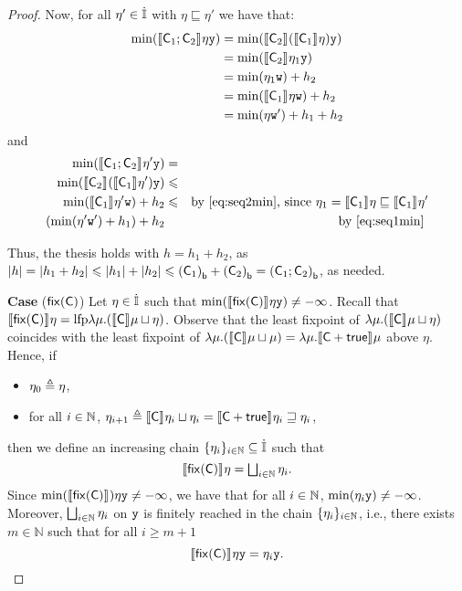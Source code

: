 \begin{proof}
  Now, for all \(\eta' \in \inte\) with \(\eta \sqsubseteq \eta'\) we have that:
  \begin{align*}
    \min(\semi{\com_1 \seq \com_2}\eta \var[y])
    &= \min(\semi{\com_2}(\semi{\com_1}\eta) \var[y])\\
    & = \min(\semi{\com_2}\eta_1 \var[y])\\
    & = \min(\eta_1 \var[w]) + h_2\\
    & = \min(\semi{\com_1}\eta \var[w]) + h_2\\
    & = \min(\eta \var[w]')+h_1 + h_2
  \end{align*}
  and
  \begin{align*}
    \min(\semi{\com_1 \seq \com_2}\eta' \var[y]) & = & \\ 
    \min(\semi{\com_2}(\semi{\com_1}\eta') \var[y]) & \leq & \\ 
    \min(\semi{\com_1}\eta' \var[w]) + h_2 & \leq & 
    \text{by~\eqref{eq:seq2min}, since } \eta_1 = \semi{\com_1}\eta \sqsubseteq \semi{\com_1}\eta' \\
    (\min(\eta' \var[w]') +h_1) + h_2 & & \text{by~\eqref{eq:seq1min}}\
  \end{align*}

  Thus, the thesis holds with \(h= h_1+h_2\), as
  \(|h| =|h_1 +h_2| \leq |h_1| + |h_2| \leq \lbound{\com_1} +
  \lbound{\com_2} = \lbound{\com_1 \seq \com_2}\), as needed.

  
  \medskip
  
  \noindent
  \textbf{Case} (\(\fix{\com}\)) 
  Let \(\eta \in \inte\) such that
  \(\min(\semi{\fix{\com}} \eta \var[y]) \neq - \infty\). Recall that
  \(\semi{\fix{\com}} \eta = \lfp{\lambda \mu. (\semi{\com} \mu
    \sqcup\eta)}\). Observe that the least fixpoint of
  \(\lambda \mu. (\semi{\com} \mu \sqcup\eta)\) coincides with the
  least fixpoint of
  \(\lambda \mu. (\semi{\com} \mu \sqcup \mu) = \lambda \mu. \semi{
    \com\ndet \tru} \mu\) above \(\eta\). Hence, if
  \begin{itemize}
  \item \(\eta_0 \veq \eta\),
  \item for all \(i\in \nat\),
    \(\eta_{i+1} \veq \semi{\com} \eta_i \sqcup \eta_i= \semi{\com \ndet
    \tru} \eta_i \sqsupseteq \eta_i\),
  \end{itemize}
  then we define an increasing chain \(\{\eta_i\}_{i\in \nat}\subseteq \inte\) such that
  \[ 
  \semi{\fix{\com}} \eta = \textstyle\bigsqcup_{i \in \nat} \eta_i.
  \]
  Since \(\min(\semi{\fix{\com}}) \eta \var[y] \neq -\infty\), we have
  that for all \(i\in \nat\), \(\min(\eta_i \var[y]) \neq
  -\infty\). Moreover, \(\textstyle\bigsqcup_{i \in \nat} \eta_i\) on
  \(\var[y]\) is finitely reached in the chain
  \(\{\eta_i\}_{i\in \nat}\), i.e., there exists \(m \in \mathbb{N}\)
  such that for all \(i \geq m+1\)
  \[
  \semi{\fix{\com}} \eta \var[y] = \eta_{i} \var[y].
  \]


\end{proof}
